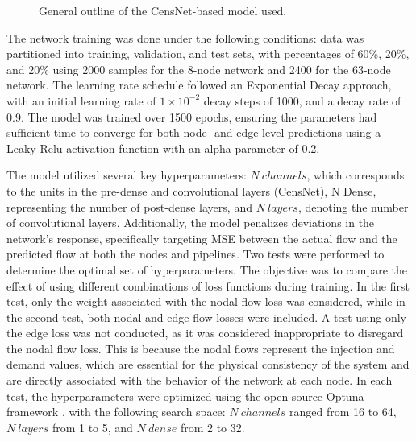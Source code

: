 \begin{itemize}
\begin{figure}
    \centering
    \setlength{}        
    \setlength{}
    \resizebox{\figurewidth}{\figureheight}{}
    \caption{General outline of the CensNet-based model used.}
    \label{fig:model_description}
\end{figure}
\end{itemize}


The network training was done under the following conditions: data was partitioned into training, validation, and test sets, with percentages of 60\%, 20\%, and 20\% using 2000 samples for the 8-node network and 2400 for the 63-node network. The learning rate schedule followed an Exponential Decay approach, with an initial learning rate of $1 \times 10^{-2}$ decay steps of 1000, and a decay rate of 0.9. The model was trained over 1500 epochs, ensuring the parameters had sufficient time to converge for both node- and edge-level predictions using a Leaky Relu activation function with an alpha parameter of 0.2.


The model utilized several key hyperparameters: $N \ channels$, which corresponds to the units in the pre-dense and convolutional layers (CensNet), N Dense, representing the number of post-dense layers, and $N \ layers$, denoting the number of convolutional layers. Additionally, the model penalizes deviations in the network's response, specifically targeting MSE between the actual flow and the predicted flow at both the nodes and pipelines. Two tests were performed to determine the optimal set of hyperparameters. The objective was to compare the effect of using different combinations of loss functions during training. In the first test, only the weight associated with the nodal flow loss was considered, while in the second test, both nodal and edge flow losses were included. A test using only the edge loss was not conducted, as it was considered inappropriate to disregard the nodal flow loss. This is because the nodal flows represent the injection and demand values, which are essential for the physical consistency of the system and are directly associated with the behavior of the network at each node. In each test, the hyperparameters were optimized using the open-source Optuna framework \cite{optuna_2019}, with the following search space: $N \ channels$ ranged from 16 to 64, $N \ layers$ from 1 to 5, and $N \ dense$ from 2 to 32.


